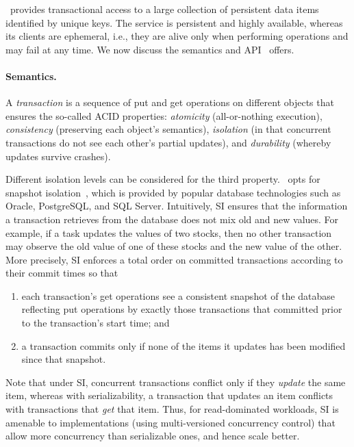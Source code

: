 
\sys\ provides transactional access to a large collection of persistent data items identified by unique keys. 
The service is persistent and highly available, 
whereas its clients are ephemeral, i.e., they are alive only when performing operations and may fail at any time.
We now discuss the semantics and API \sys\ offers.

{\paragraph{Semantics.} 
A \emph{transaction} is a sequence of put and get operations on different objects that ensures the so-called ACID properties:
\emph{atomicity} (all-or-nothing execution), \emph{consistency} (preserving each object's semantics), 
\emph{isolation} (in that concurrent transactions do not see each other's partial updates), and 
\emph{durability} (whereby updates survive crashes).

Different isolation levels can be considered for the third property. \sys\ opts for  snapshot isolation~\cite{DBLP:conf/sigmod/BerensonBGMOO95}, which is provided by popular database technologies such as Oracle, PostgreSQL, and SQL Server. 
Intuitively, SI ensures that the information a transaction retrieves from the database 
does not mix old and new values. For example, if a task updates the values of two stocks, then no other transaction may observe the old value of one of these stocks and the new value of the other. 
%
More precisely, SI enforces a total order on committed transactions according to their commit times so that 

\begin{enumerate}
    \setlength{\itemsep}{0pt}
    \setlength{\parskip}{0pt}
    \setlength{\parsep}{2pt}  
\item
each transaction's get operations see a consistent snapshot of the database reflecting put operations by
 exactly those transactions that committed prior to the transaction's start time; and 
\item
 a transaction commits only if none of the items it updates has been modified since that snapshot.
 \end{enumerate}
Note that under SI,  concurrent transactions conflict only if they  \emph{update} the same item, whereas with 
serializability, a transaction that updates an item conflicts with transactions that \emph{get} that item. Thus, for read-dominated workloads, SI is amenable to implementations (using multi-versioned concurrency control) that 
allow more concurrency than serializable ones, and hence scale better.

}
